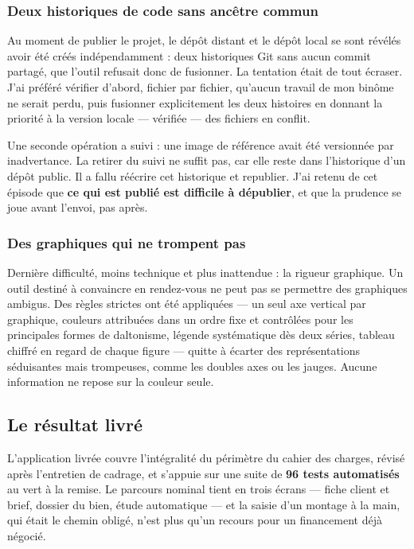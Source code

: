 \documentclass[12pt,a4paper]{article}
\begin{document}
\subsubsection{Deux historiques de code sans ancêtre commun}

Au moment de publier le projet, le dépôt distant et le dépôt local se sont
révélés avoir été créés indépendamment : deux historiques Git sans aucun commit
partagé, que l'outil refusait donc de fusionner. La tentation était de tout
écraser. J'ai préféré vérifier d'abord, fichier par fichier, qu'aucun travail de
mon binôme ne serait perdu, puis fusionner explicitement les deux histoires en
donnant la priorité à la version locale --- vérifiée --- des fichiers en conflit.

Une seconde opération a suivi : une image de référence avait été versionnée par
inadvertance. La retirer du suivi ne suffit pas, car elle reste dans l'historique
d'un dépôt public. Il a fallu réécrire cet historique et republier. J'ai retenu
de cet épisode que \textbf{ce qui est publié est difficile à dépublier}, et que
la prudence se joue avant l'envoi, pas après.

\subsubsection{Des graphiques qui ne trompent pas}

Dernière difficulté, moins technique et plus inattendue : la rigueur graphique.
Un outil destiné à convaincre en rendez-vous ne peut pas se permettre des
graphiques ambigus. Des règles strictes ont été appliquées --- un seul axe
vertical par graphique, couleurs attribuées dans un ordre fixe et contrôlées
pour les principales formes de daltonisme, légende systématique dès deux séries,
tableau chiffré en regard de chaque figure --- quitte à écarter des
représentations séduisantes mais trompeuses, comme les doubles axes ou les
jauges. Aucune information ne repose sur la couleur seule.

\subsection{Le résultat livré}

L'application livrée couvre l'intégralité du périmètre du cahier des charges,
révisé après l'entretien de cadrage, et s'appuie sur une suite de
\textbf{96 tests automatisés} au vert à la remise. Le parcours nominal tient en
trois écrans --- fiche client et brief, dossier du bien, étude automatique ---
et la saisie d'un montage à la main, qui était le chemin obligé, n'est plus qu'un
recours pour un financement déjà négocié.
\end{document}
